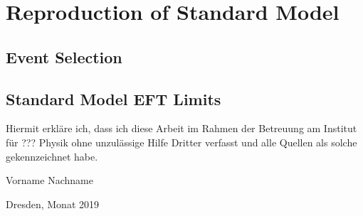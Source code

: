 \pagebreak
\chapter{Reproduction of Standard Model}
    \section{Event Selection}
        

   \section{Standard Model EFT Limits}
        
\clearpage
\thispagestyle{empty}
\vspace*{1.5em}

Hiermit erkläre ich, dass ich diese Arbeit im Rahmen der Betreuung am Institut
für ??? Physik ohne unzulässige Hilfe Dritter verfasst und alle Quellen als solche gekennzeichnet habe.

\vspace*{45em}

Vorname Nachname \par
Dresden, Monat 2019
